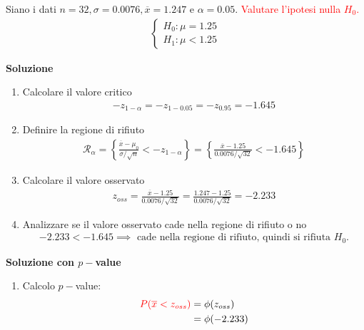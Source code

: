 \documentclass{article}  %
\theoremstyle{definition}
\begin{document}
\begin{esercizio}
	Siano i dati $n=32, \sigma=0.0076, \overline{x}=1.247$ e $\alpha=0.05$.
	\textcolor{red}{Valutare
		l'ipotesi nulla $H_0$.}
	\begin{align*}
		\begin{cases}
			H_0: \mu = 1.25 \\
			H_1: \mu < 1.25
		\end{cases}
	\end{align*}
	\begin{center}
		\textbf{Soluzione}
	\end{center}
	\begin{enumerate}
		\item Calcolare il valore critico
		      \begin{align*}
			      -z_{1-\alpha}=-z_{1-0.05}=-z_{0.95}=-1.645
		      \end{align*}
		\item Definire la regione di rifiuto
		      \begin{align*}
			      \mathcal{R}_{\alpha}=\left\{\frac{\overline{x}-\mu_0}{\sigma/\sqrt{n}} < -z_{1-\alpha} \right\} = \left\{\frac{\overline{x}-1.25}{0.0076/\sqrt{32}} < -1.645\right\}
		      \end{align*}
		\item Calcolare il valore osservato
		      \begin{align*}
			      z_{oss} = \frac{\overline{x}-1.25}{0.0076/\sqrt{32}} = \frac{1.247-1.25}{0.0076/\sqrt{32}} = -2.233
		      \end{align*}
		\item Analizzare se il valore osservato cade nella regione di rifiuto o no
		      \begin{align*}
			      -2.233 < -1.645 \implies \text{ cade nella regione di rifiuto, quindi si rifiuta } H_0.
		      \end{align*}
	\end{enumerate}
	\begin{center}
		\textbf{Soluzione con $p-$value}
	\end{center}
	\begin{enumerate}
		\item Calcolo $p-$value:
		      \begin{align*}
			      \textcolor{red}{P(\overline{x} < z_ {oss})} & = \phi(z_{oss})       \\
			                                                  & = \phi(-2.233)        \\

\end{align*}
\end{enumerate}
\end{esercizio}
\end{document}
